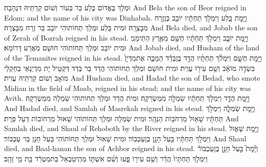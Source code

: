 {וּמְלַךְ בֶּאֱדוֹם בֶּלַע בַּר בְּעוֹר וְשׁוֹם קַרְתֵּיהּ דִּנְהָבָה׃}
{And Bela the son of Beor reigned in Edom; and the name of his city was Dinhabah.}{}
{וַיָּ֖מׇת בָּ֑לַע וַיִּמְלֹ֣ךְ תַּחְתָּ֔יו יוֹבָ֥ב בֶּן\maqqaf זֶ֖רַח מִבׇּצְרָֽה׃}
{וּמִית בָּלַע וּמְלַךְ תְּחוֹתוֹהִי יוֹבָב בַּר זֶרַח מִבָּצְרָה׃}
{And Bela died, and Jobab the son of Zerah of Bozrah reigned in his stead.}{}
{וַיָּ֖מׇת יוֹבָ֑ב וַיִּמְלֹ֣ךְ תַּחְתָּ֔יו חֻשָׁ֖ם מֵאֶ֥רֶץ הַתֵּימָנִֽי׃}
{וּמִית יוֹבָב וּמְלַךְ תְּחוֹתוֹהִי חוּשָׁם מֵאֲרַע דָּרוֹמָא׃}
{And Jobab died, and Husham of the land of the Temanites reigned in his stead.}{}
{וַיָּ֖מׇת חֻשָׁ֑ם וַיִּמְלֹ֨ךְ תַּחְתָּ֜יו הֲדַ֣ד בֶּן\maqqaf בְּדַ֗ד הַמַּכֶּ֤ה אֶת\maqqaf מִדְיָן֙ בִּשְׂדֵ֣ה מוֹאָ֔ב וְשֵׁ֥ם עִיר֖וֹ עֲוִֽית׃}
{וּמִית חוּשָׁם וּמְלַךְ תְּחוֹתוֹהִי הֲדַד בַּר בְּדַד דְּקַטֵּיל יָת מִדְיַנָאֵי בְּחַקְלֵי מוֹאָב וְשׁוֹם קַרְתֵּיהּ עֲוִית׃}
{And Husham died, and Hadad the son of Bedad, who smote Midian in the field of Moab, reigned in his stead; and the name of his city was Avith.}{}
{וַיָּ֖מׇת הֲדָ֑ד וַיִּמְלֹ֣ךְ תַּחְתָּ֔יו שַׂמְלָ֖ה מִמַּשְׂרֵקָֽה׃}
{וּמִית הֲדָד וּמְלַךְ תְּחוֹתוֹהִי שַׂמְלָה מִמַּשְׂרֵקָה׃}
{And Hadad died, and Samlah of Masrekah reigned in his stead.}{}
{וַיָּ֖מׇת שַׂמְלָ֑ה וַיִּמְלֹ֣ךְ תַּחְתָּ֔יו שָׁא֖וּל מֵרְחֹב֥וֹת הַנָּהָֽר׃}
{וּמִית שַׂמְלָה וּמְלַךְ תְּחוֹתוֹהִי שָׁאוּל מֵרְחוֹבוֹת דְּעַל פְּרָת׃}
{And Samlah died, and Shaul of Rehoboth by the River reigned in his stead.}{}
{וַיָּ֖מׇת שָׁא֑וּל וַיִּמְלֹ֣ךְ תַּחְתָּ֔יו בַּ֥עַל חָנָ֖ן בֶּן\maqqaf עַכְבּֽוֹר׃}
{וּמִית שָׁאוּל וּמְלַךְ תְּחוֹתוֹהִי בַּעַל חָנָן בַּר עַכְבּוֹר׃}
{And Shaul died, and Baal-hanan the son of Achbor reigned in his stead.}{}
{וַיָּ֘מׇת֮ בַּ֣עַל חָנָ֣ן בֶּן\maqqaf עַכְבּוֹר֒ וַיִּמְלֹ֤ךְ תַּחְתָּיו֙ הֲדַ֔ר וְשֵׁ֥ם עִיר֖וֹ פָּ֑עוּ וְשֵׁ֨ם אִשְׁתּ֤וֹ מְהֵֽיטַבְאֵל֙ בַּת\maqqaf מַטְרֵ֔ד בַּ֖ת מֵ֥י זָהָֽב׃}
